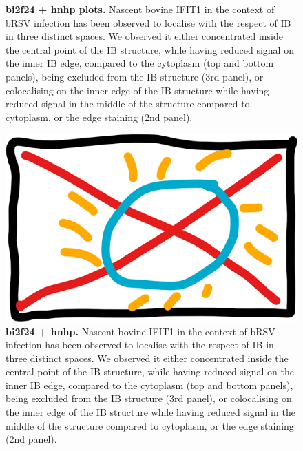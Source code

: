 \begin{figure}
\begin{subfigure}{0.5\textwidth}
    \end{subfigure}
    \caption[bi2f24 + hnhp plots]{\textbf{bi2f24 + hnhp plots.} Nascent bovine IFIT1 in the context of bRSV infection has been observed to localise with the respect of IB in three distinct spaces. We observed it either concentrated inside the central point of the IB structure, while having reduced signal on the inner IB edge, compared to the cytoplasm (top and bottom panels), being excluded from the IB structure (3rd panel), or colocalising on the inner edge of the IB structure while having reduced signal in the middle of the structure compared to cytoplasm, or the edge staining (2nd panel).}
    \label{fig:bi2f24 + hnhp plots}
\end{figure}

\begin{figure}
    \centering
    \includegraphics[width=1\linewidth]{10. Chapter 5/Figs/00. placeholder.png}
    \caption[bi2f24 + hnhp]{\textbf{bi2f24 + hnhp.} Nascent bovine IFIT1 in the context of bRSV infection has been observed to localise with the respect of IB in three distinct spaces. We observed it either concentrated inside the central point of the IB structure, while having reduced signal on the inner IB edge, compared to the cytoplasm (top and bottom panels), being excluded from the IB structure (3rd panel), or colocalising on the inner edge of the IB structure while having reduced signal in the middle of the structure compared to cytoplasm, or the edge staining (2nd panel).}
    \label{fig:bi2f24 + hnhp}
\end{figure}

